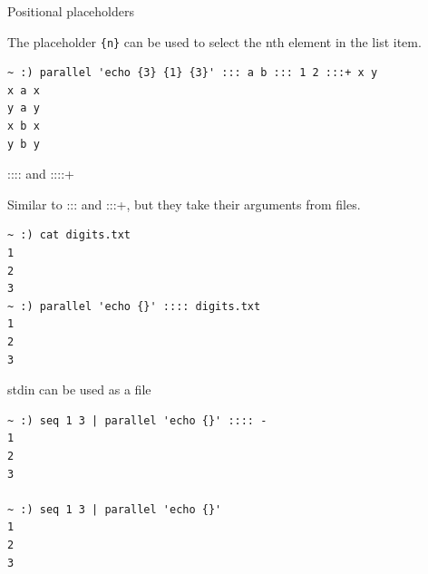 \documentclass{beamer}
\renewcommand\big[1]{
  \begin{center}
    \Large{#1}
  \end{center}
}
\begin{document}
\begin{frame}[fragile]
  \big{Positional placeholders}
  The placeholder \texttt{\{n\}} can be used to select the nth element in the list item.
\begin{verbatim}
~ :) parallel 'echo {3} {1} {3}' ::: a b ::: 1 2 :::+ x y
x a x
y a y
x b x
y b y
\end{verbatim}
\end{frame}

\begin{frame}[fragile]
  \big{:::: and ::::+}
  Similar to ::: and :::+, but they take their arguments from files.
\begin{verbatim}
~ :) cat digits.txt
1
2
3
~ :) parallel 'echo {}' :::: digits.txt
1
2
3
\end{verbatim}
\end{frame}

\begin{frame}[fragile]
  \big{stdin can be used as a file}
\begin{verbatim}
~ :) seq 1 3 | parallel 'echo {}' :::: -
1
2
3

~ :) seq 1 3 | parallel 'echo {}'
1
2
3
\end{verbatim}
\end{frame}
\end{document}
